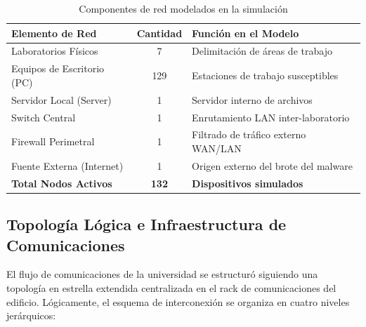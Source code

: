 \begin{table}[htbp]
\caption{Componentes de red modelados en la simulación}
\label{tab:dispositivos}
\begin{center}
\begin{tabular}{|p{}|c|p{}|}
\hline
\textbf{Elemento de Red} & \textbf{Cantidad} & \textbf{Función en el Modelo} \\ \hline
Laboratorios Físicos & 7 & Delimitación de áreas de trabajo \\ \hline
Equipos de Escritorio (PC) & 129 & Estaciones de trabajo susceptibles \\ \hline
Servidor Local (Server) & 1 & Servidor interno de archivos \\ \hline
Switch Central & 1 & Enrutamiento LAN inter-laboratorio \\ \hline
Firewall Perimetral & 1 & Filtrado de tráfico externo WAN/LAN \\ \hline
Fuente Externa (Internet) & 1 & Origen externo del brote del malware \\ \hline
\textbf{Total Nodos Activos} & \textbf{132} & \textbf{Dispositivos simulados} \\ \hline
\end{tabular}
\end{center}
\end{table}

\subsection{Topología Lógica e Infraestructura de Comunicaciones}
El flujo de comunicaciones de la universidad se estructuró siguiendo una topología en estrella extendida centralizada en el rack de comunicaciones del edificio. Lógicamente, el esquema de interconexión se organiza en cuatro niveles jerárquicos:


